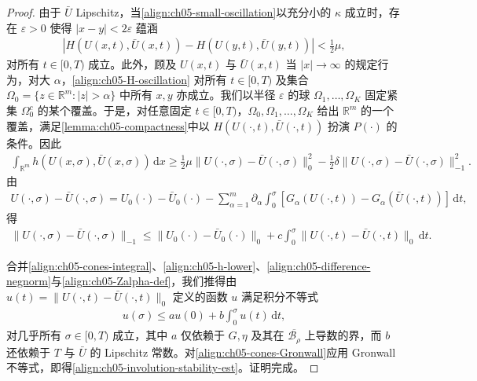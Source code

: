 \documentclass[../../main.tex]{subfiles}
\begin{document}
\begin{proof}
由于 $\bar{U}$ Lipschitz，当\eqref{align:ch05-small-oscillation}以充分小的 $\kappa$ 成立时，存在 $\varepsilon>0$ 使得 $|x-y|<2\varepsilon$ 蕴涵
\begin{align}
|H(U(x,t),\bar{U}(x,t))-H(U(y,t),\bar{U}(y,t))|<\frac{1}{2}\mu,\label{align:ch05-H-oscillation}
\end{align}
对所有 $t\in[0,T)$ 成立。此外，顾及 $U(x,t)$ 与 $\bar{U}(x,t)$ 当 $|x|\to\infty$ 的规定行为，对大 $\alpha$，\eqref{align:ch05-H-oscillation} 对所有 $t\in[0,T)$ 及集合 $\Omega_{0}=\{z\in\mathbb{R}^{m}:|z|>\alpha\}$ 中所有 $x,y$ 亦成立。我们以半径 $\varepsilon$ 的球 $\Omega_{1},\ldots,\Omega_{K}$ 固定紧集 $\Omega_{0}^{c}$ 的某个覆盖。于是，对任意固定 $t\in[0,T)$，$\Omega_{0},\Omega_{1},\ldots,\Omega_{K}$ 给出 $\mathbb{R}^{m}$ 的一个覆盖，满足\cref{lemma:ch05-compactness}中以 $H(U(\cdot,t),\bar{U}(\cdot,t))$ 扮演 $P(\cdot)$ 的条件。因此
\begin{align}
\int_{\mathbb{R}^{m}}h(U(x,\sigma),\bar{U}(x,\sigma))\,\mathrm{d}x\geqslant\frac{1}{2}\mu\|U(\cdot,\sigma)-\bar{U}(\cdot,\sigma)\|_{0}^{2}-\frac{1}{2}\delta\|U(\cdot,\sigma)-\bar{U}(\cdot,\sigma)\|_{-1}^{2}.\label{align:ch05-h-lower}
\end{align}
由
\begin{align}
U(\cdot,\sigma)-\bar{U}(\cdot,\sigma)=U_{0}(\cdot)-\bar{U}_{0}(\cdot)-\sum_{\alpha=1}^{m}\partial_{\alpha}\int_{0}^{\sigma}[G_{\alpha}(U(\cdot,t))-G_{\alpha}(\bar{U}(\cdot,t))]\,\mathrm{d}t,\label{align:ch05-difference-rep}
\end{align}
得
\begin{align}
\|U(\cdot,\sigma)-\bar{U}(\cdot,\sigma)\|_{-1}\leqslant\|U_{0}(\cdot)-\bar{U}_{0}(\cdot)\|_{0}+c\int_{0}^{\sigma}\|U(\cdot,t)-\bar{U}(\cdot,t)\|_{0}\,\mathrm{d}t.\label{align:ch05-difference-negnorm}
\end{align}

合并\eqref{align:ch05-cones-integral}、\eqref{align:ch05-h-lower}、\eqref{align:ch05-difference-negnorm}与\eqref{align:ch05-Zalpha-def}，我们推得由 $u(t)=\|U(\cdot,t)-\bar{U}(\cdot,t)\|_{0}$ 定义的函数 $u$ 满足积分不等式
\begin{align}
u(\sigma)\leqslant au(0)+b\int_{0}^{\sigma}u(t)\,\mathrm{d}t,\label{align:ch05-cones-Gronwall}
\end{align}
对几乎所有 $\sigma\in[0,T)$ 成立，其中 $a$ 仅依赖于 $G,\eta$ 及其在 $\overline{\mathscr{B}_{\rho}}$ 上导数的界，而 $b$ 还依赖于 $T$ 与 $\bar{U}$ 的 Lipschitz 常数。对\eqref{align:ch05-cones-Gronwall}应用 Gronwall 不等式，即得\eqref{align:ch05-involution-stability-est}。证明完成。
\end{proof}
\end{document}

